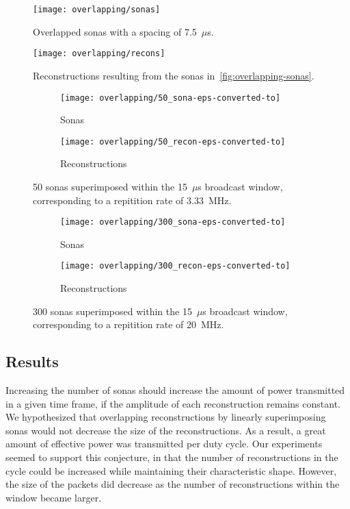\begin{figure}
\centering
\texttt{[image: overlapping/sonas]}
\caption[Overlapped sonas]{Overlapped sonas with a spacing of 7.5~$\mu$s.}
\label{fig:overlapping-sonas}

\vspace*{\floatsep}%

\texttt{[image: overlapping/recons]}
\caption[Overlapped reconstructions]{Reconstructions resulting from the sonas in~\ref{fig:overlapping-sonas}.}
\label{fig:overlapping-recons}
\end{figure}

\begin{figure}
\centering
\begin{subfigure}{.5\textwidth}
  \centering
  \texttt{[image: overlapping/50\_sona-eps-converted-to]}
  \caption{Sonas}
\end{subfigure}%
\begin{subfigure}{.5\textwidth}
  \centering
  \texttt{[image: overlapping/50\_recon-eps-converted-to]}
  \caption{Reconstructions}
\end{subfigure}
\caption[50 superimposed sonas]{50 sonas superimposed within the 15~$\mu$s broadcast window, corresponding to a repitition rate of 3.33~MHz.}
\label{fig:overlapping-50}

\vspace*{\floatsep}%

\begin{subfigure}{.5\textwidth}
  \centering
  \texttt{[image: overlapping/300\_sona-eps-converted-to]}
  \caption{Sonas}
\end{subfigure}%
\begin{subfigure}{.5\textwidth}
  \centering
  \texttt{[image: overlapping/300\_recon-eps-converted-to]}
  \caption{Reconstructions}
\end{subfigure}
\caption[300 superimposed sonas]{300 sonas superimposed within the 15~$\mu$s broadcast window, corresponding to a repitition rate of 20~MHz.}
\label{fig:overlapping-300}
\end{figure}

\subsection{Results}

Increasing the number of sonas should increase the amount of power transmitted in a given time frame, if the amplitude of each reconstruction remains constant. We hypothesized that overlapping reconstructions by linearly superimposing sonas would not decrease the size of the reconstructions. As a result, a great amount of effective power was transmitted per duty cycle. Our experiments seemed to support this conjecture, in that the number of reconstructions in the cycle could be increased while maintaining their characteristic shape. However, the size of the packets did decrease as the number of reconstructions within the window became larger.


